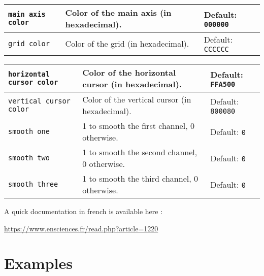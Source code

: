 \documentclass[11pt,a4paper,usenames,dvipsnames]{article}
\begin{document}
\begin{tcolorbox}[enhanced,breakable,colback=white,colframe=black,width=\textwidth,left=0mm,right=0mm,top=0mm,bottom=0mm,boxsep=0mm]
\begin{tabular}{p{}|p{}|p{}}
        \texttt{main axis color}       & Color of the main axis (in hexadecimal).                                                                               & Default: \texttt{000000}                                        \\\hline
        \texttt{grid color}            & Color of the grid (in hexadecimal).                                                                                    & Default: \texttt{CCCCCC}
    \end{tabular}
\end{tcolorbox}


\begin{tcolorbox}[enhanced,breakable,colback=white,colframe=black,width=\textwidth,left=0mm,right=0mm,top=0mm,bottom=0mm,boxsep=0mm]
    \begin{tabular}{p{}|p{}|p{}}

        \texttt{horizontal cursor color} & Color of the horizontal cursor (in hexadecimal). & Default: \texttt{FFA500} \\\hline
        \texttt{vertical cursor color}   & Color of the vertical cursor (in hexadecimal).   & Default: \texttt{800080}\\\hline
        \texttt{smooth one}                      & 1 to smooth the first channel, 0 otherwise.                                                                            & Default: \texttt{0}\\\hline
        \texttt{smooth two}                      & 1 to smooth the second channel, 0 otherwise.                                                                           & Default: \texttt{0}\\\hline
        \texttt{smooth three}                    & 1 to smooth the third channel, 0 otherwise.                                                                            & Default: \texttt{0}
    \end{tabular}
\end{tcolorbox}


A quick documentation in french is available here :

\begin{center}
    \url{https://www.ensciences.fr/read.php?article=1220}
\end{center}


\section{Examples}
\end{document}
